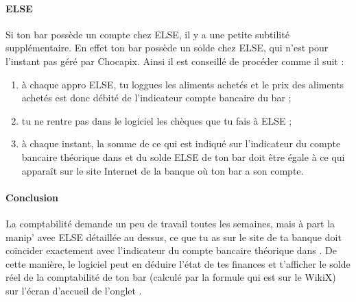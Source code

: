 \documentclass[12pt,french]{article}
\begin{document}

\paragraph{ELSE} Si ton bar possède un compte chez ELSE, il y a une petite subtilité supplémentaire. En effet ton bar possède un solde chez ELSE, qui n'est pour l'instant pas géré par Chocapix. Ainsi il est conseillé de procéder comme il suit :
\begin{enumerate}
	\item à chaque appro ELSE, tu loggues les aliments achetés et le prix des aliments achetés est donc débité de l'indicateur compte bancaire du bar ;
	\item tu ne rentre pas dans le logiciel les chèques que tu fais à ELSE ;
	\item à chaque instant, la somme de ce qui est indiqué sur l'indicateur du compte bancaire théorique dans  et du solde ELSE de ton bar doit être égale à ce qui apparaît sur le site Internet de la banque où ton bar a son compte.
\end{enumerate}

\paragraph{Conclusion} La comptabilité demande un peu de travail toutes les semaines, mais à part la manip' avec ELSE détaillée au dessus, ce que tu as sur le site de ta banque doit coïncider exactement avec l'indicateur du compte bancaire théorique dans . De cette manière, le logiciel peut en déduire l'état de tes finances et t'afficher le solde réel de la comptabilité de ton bar (calculé par la formule qui est sur le WikiX) sur l'écran d'accueil de l'onglet .
\end{document}
